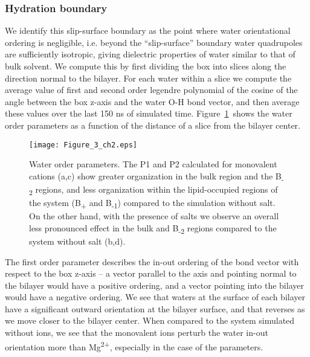 \subsubsection{Hydration boundary}
We {identify} this 
slip-surface boundary as the point where 
water orientational ordering is negligible, i.e.
beyond the ``slip-surface'' 
boundary water {quadrupoles} are {sufficiently isotropic,
giving dielectric properties of water similar to that of bulk solvent}.
We compute this by first dividing the box into 
slices along the direction normal to the bilayer. 
For each water within a slice we 
compute the average value of first and second order legendre polynomial of 
the cosine of the angle between the box z-axis and
the water O-H bond vector, and then average these values over the last 150 ns of simulated time.
Figure~\ref{fig:h2order:ch2}~shows the water order parameters 
as a function of the distance of a slice from the bilayer center.
\begin{figure}
    \caption[Water orientational order parameters]{Water order parameters.   
        {The P1 and P2 calculated for monovalent cations (a,c) show greater 
            organization in the bulk region and the B\textsubscript{-2} regions, and less organization within 
            the lipid-occupied regions of the system (B\textsubscript{+} and B\textsubscript{-1}) compared to the simulation without salt. 
        } 
{On the other hand, with the presence of \mg salts we observe an overall less pronounced effect in the
bulk and B\textsubscript{-2} regions compared to the system without salt (b,d).}
}
    
    \label{fig:h2order:ch2}
    \texttt{[image: Figure\_3\_ch2.eps]}
\end{figure}

The first order parameter describes the in-out ordering of the bond vector with respect to the 
box z-axis -- a vector parallel to the axis and pointing normal to the bilayer would have a positive
ordering, and a vector pointing into the bilayer would have a negative ordering. We see that waters at the surface
of each bilayer have a significant outward orientation at the bilayer surface, and that reverses as we move
closer to the bilayer center. When compared to the system simulated without ions, we see that
the monovalent ions perturb the water in-out orientation 
more than Mg\textsuperscript{2+}, especially in the case of the \mgmicro
parameters.

